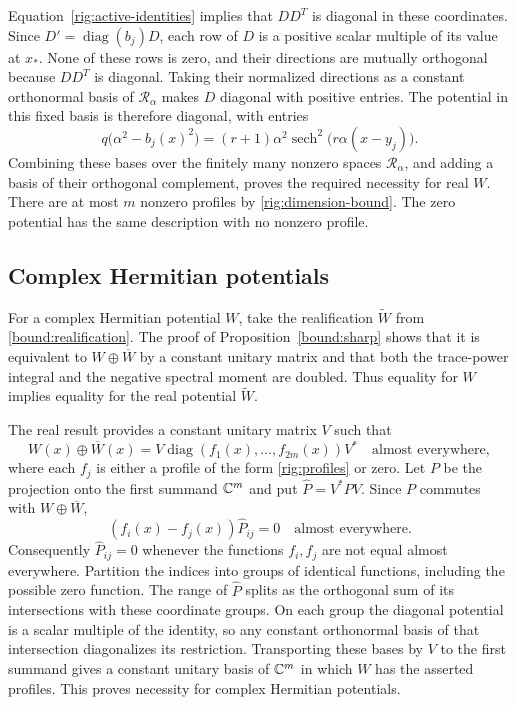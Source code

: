 Equation~\eqref{rig:active-identities} implies that $DD^T$ is diagonal
in these coordinates.  Since $D'=\operatorname{diag}(b_j)D$, each row
of $D$ is a positive scalar multiple of its value at $x_*$.  None of
these rows is zero, and their directions are mutually orthogonal because
$DD^T$ is diagonal.  Taking their normalized directions as a constant
orthonormal basis of $\mathcal R_\alpha$ makes $D$ diagonal with positive
entries.  The potential in this fixed basis is therefore diagonal, with
entries
\begin{equation}\label{rig:profiles}
 q\bigl(\alpha^2-b_j(x)^2\bigr)
 =(r+1)\alpha^2\operatorname{sech}^2\bigl(r\alpha(x-y_j)\bigr).
\end{equation}
Combining these bases over the finitely many nonzero spaces
$\mathcal R_\alpha$, and adding a basis of their orthogonal complement,
proves the required necessity for real $W$.  There are at most $m$
nonzero profiles by \eqref{rig:dimension-bound}.  The zero potential
has the same description with no nonzero profile.

\subsection{Complex Hermitian potentials}

For a complex Hermitian potential $W$, take the realification
$\widetilde W$ from \eqref{bound:realification}.  The proof of
Proposition~\ref{bound:sharp} shows that it is equivalent to
$W\oplus\overline W$ by a constant unitary matrix and that both the trace-power
integral and the negative spectral moment are doubled.  Thus equality
for $W$ implies equality for the real potential $\widetilde W$.

The real result provides a constant unitary matrix $V$ such that
\[
 W(x)\oplus\overline W(x)
   =V\operatorname{diag}(f_1(x),\ldots,f_{2m}(x))V^*
 \quad\text{almost everywhere},
\]
where each $f_j$ is either a profile of the form \eqref{rig:profiles} or
zero.  Let $P$ be the projection onto the first summand $\mathbb C^m$ and put
$\widehat P=V^*PV$.  Since $P$ commutes with $W\oplus\overline W$,
\[
 (f_i(x)-f_j(x))\widehat P_{ij}=0
 \quad\text{almost everywhere}.
\]
Consequently $\widehat P_{ij}=0$ whenever the functions $f_i,f_j$ are
not equal almost everywhere.  Partition the indices into groups of
identical functions, including the possible zero function.  The range
of $\widehat P$ splits as the orthogonal sum of its intersections with
these coordinate groups.  On each group the diagonal potential is a
scalar multiple of the identity, so any constant orthonormal basis of
that intersection diagonalizes its restriction.  Transporting these
bases by $V$ to the first summand gives a constant unitary basis of
$\mathbb C^m$ in which $W$ has the asserted profiles.  This proves necessity
for complex Hermitian potentials.

